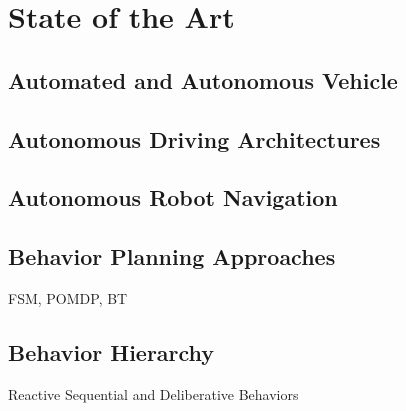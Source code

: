 \chapter{State of the Art}
\label{cha:state of the art}

\section{Automated and Autonomous Vehicle}

\section{Autonomous Driving Architectures}

\section{Autonomous Robot Navigation}

\section{Behavior Planning Approaches}

FSM, POMDP, BT

\section{Behavior Hierarchy}

Reactive Sequential and Deliberative Behaviors